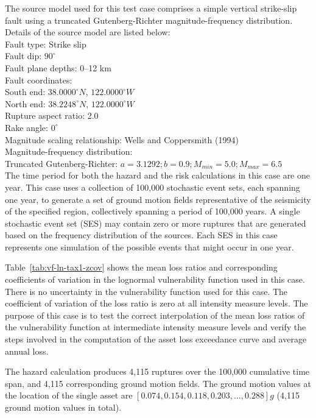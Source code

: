 The source model used for this test case comprises a simple vertical strike-slip fault using a truncated Gutenberg-Richter magnitude-frequency distribution.\\

\noindent Details of the source model are listed below:\\

\noindent
Fault type: Strike slip\\
Fault dip: $90^{\circ}$\\
Fault plane depths: 0--12 km\\
Fault coordinates:\\
South end: $38.0000^{\circ} N$, $122.0000^{\circ} W$\\
North end: $38.2248^{\circ} N$, $122.0000^{\circ} W$\\
Rupture aspect ratio: 2.0\\
Rake angle: $0^{\circ}$\\
Magnitude scaling relationship: Wells and Coppersmith (1994)\\
Magnitude-frequency distribution:\\
Truncated Gutenberg-Richter: $a = 3.1292; b = 0.9; M_{min} = 5.0; M_{max} = 6.5$\\

The time period for both the hazard and the risk calculations in this case are one year. This case uses a collection of 100,000 stochastic event sets, each spanning one year, to generate a set of ground motion fields representative of the seismicity of the specified region, collectively spanning a period of 100,000 years. A single stochastic event set (SES) may contain zero or more ruptures that are generated based on the frequency distribution of the sources. Each SES in this case represents one simulation of the possible events that might occur in one year.

Table~\ref{tab:vf-ln-tax1-zcov} shows the mean loss ratios and corresponding coefficients of variation in the lognormal vulnerability function used in this case. There is no uncertainty in the vulnerability function used for this case. The coefficient of variation of the loss ratio is zero at all intensity measure levels. The purpose of this case is to test the correct interpolation of the mean loss ratios of the vulnerability function at intermediate intensity measure levels and verify the steps involved in the computation of the asset loss exceedance curve and average annual loss.

The hazard calculation produces 4,115 ruptures over the 100,000 cumulative time span, and 4,115 corresponding ground motion fields. The ground motion values at the location of the single asset are $[0.074, 0.154, 0.118, 0.203, \dots, 0.288] g$ (4,115 ground motion values in total).

